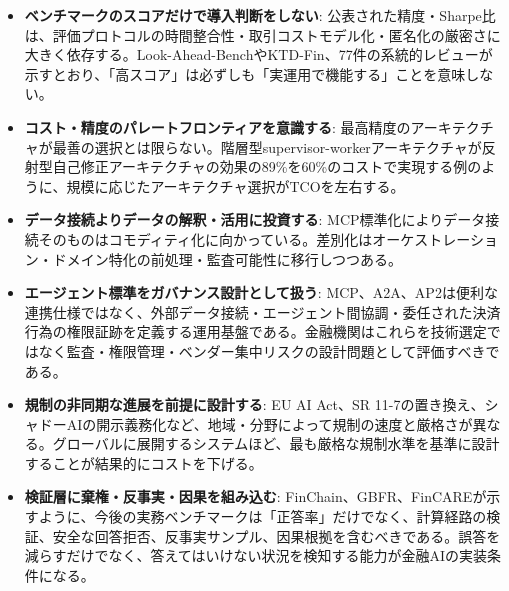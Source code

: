 \begin{itemize}
  \item \textbf{ベンチマークのスコアだけで導入判断をしない}: 公表された精度・Sharpe比は、評価プロトコルの時間整合性・取引コストモデル化・匿名化の厳密さに大きく依存する。Look-Ahead-Bench\cite{lookaheadbench2026}やKTD-Fin\cite{fromknowingtodoing2026}、77件の系統的レビュー\cite{agentictrading2026}が示すとおり、「高スコア」は必ずしも「実運用で機能する」ことを意味しない。
  \item \textbf{コスト・精度のパレートフロンティアを意識する}: 最高精度のアーキテクチャが最善の選択とは限らない。階層型supervisor-workerアーキテクチャが反射型自己修正アーキテクチャの効果の89\%を60\%のコストで実現する例のように\cite{benchmarkingmultiagent2026}、規模に応じたアーキテクチャ選択がTCOを左右する。
  \item \textbf{データ接続よりデータの解釈・活用に投資する}: MCP標準化によりデータ接続そのものはコモディティ化に向かっている\cite{factset_mcp_nd}。差別化はオーケストレーション・ドメイン特化の前処理・監査可能性に移行しつつある。
  \item \textbf{エージェント標準をガバナンス設計として扱う}: MCP、A2A、AP2は便利な連携仕様ではなく、外部データ接続・エージェント間協調・委任された決済行為の権限証跡を定義する運用基盤である\cite{x01openai2025responsesmcp,x01google2025a2a,x01google2025ap2,x01linuxfoundation2026a2a}。金融機関はこれらを技術選定ではなく監査・権限管理・ベンダー集中リスクの設計問題として評価すべきである。
  \item \textbf{規制の非同期な進展を前提に設計する}: EU AI Act\cite{eba2025aiact}、SR 11-7の置き換え\cite{databricksndmodelrisk}、シャドーAIの開示義務化\cite{wsgrndshadowai}など、地域・分野によって規制の速度と厳格さが異なる。グローバルに展開するシステムほど、最も厳格な規制水準を基準に設計することが結果的にコストを下げる。
  \item \textbf{検証層に棄権・反事実・因果を組み込む}: FinChain\cite{x05finchain2025}、GBFR\cite{x05gbfr2026}、FinCARE\cite{x07fincare2025}が示すように、今後の実務ベンチマークは「正答率」だけでなく、計算経路の検証、安全な回答拒否、反事実サンプル、因果根拠を含むべきである。誤答を減らすだけでなく、答えてはいけない状況を検知する能力が金融AIの実装条件になる。
\end{itemize}

